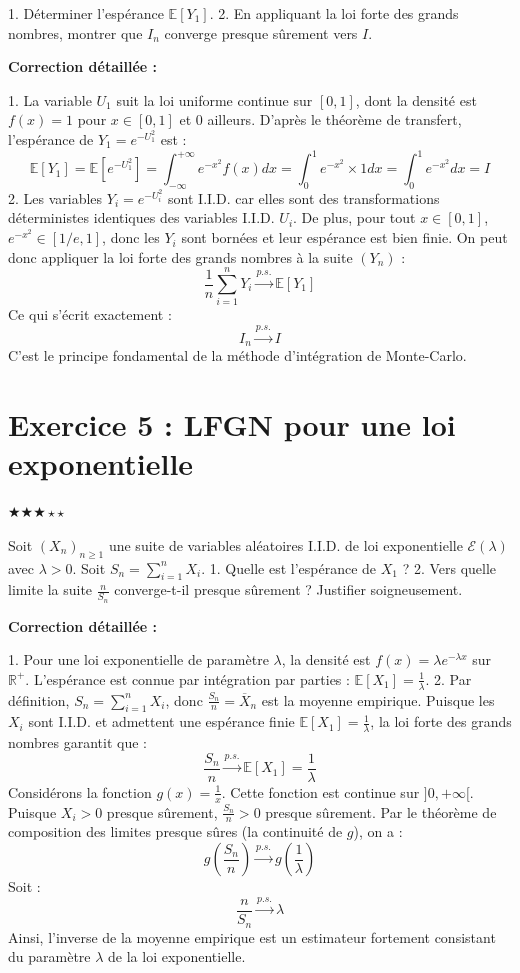 \documentclass[11pt,a4paper]{article}
\begin{document}
1. Déterminer l'espérance $\mathbb{E}[Y_1]$.
2. En appliquant la loi forte des grands nombres, montrer que $I_n$ converge presque sûrement vers $I$.

\textbf{Correction détaillée :}

1. La variable $U_1$ suit la loi uniforme continue sur $[0, 1]$, dont la densité est $f(x) = 1$ pour $x \in [0, 1]$ et $0$ ailleurs.
   D'après le théorème de transfert, l'espérance de $Y_1 = e^{-U_1^2}$ est :
   $$ \mathbb{E}[Y_1] = \mathbb{E}[e^{-U_1^2}] = \int_{-\infty}^{+\infty} e^{-x^2} f(x) dx = \int_0^1 e^{-x^2} \times 1 dx = \int_0^1 e^{-x^2} dx = I $$
2. Les variables $Y_i = e^{-U_i^2}$ sont I.I.D. car elles sont des transformations déterministes identiques des variables I.I.D. $U_i$.
   De plus, pour tout $x \in [0, 1]$, $e^{-x^2} \in [1/e, 1]$, donc les $Y_i$ sont bornées et leur espérance est bien finie.
   On peut donc appliquer la loi forte des grands nombres à la suite $(Y_n)$ :
   $$ \frac{1}{n} \sum_{i=1}^n Y_i \xrightarrow{p.s.} \mathbb{E}[Y_1] $$
   Ce qui s'écrit exactement :
   $$ I_n \xrightarrow{p.s.} I $$
   C'est le principe fondamental de la méthode d'intégration de Monte-Carlo.


\section*{Exercice 5 : LFGN pour une loi exponentielle}

$\bigstar\bigstar\bigstar\star\star$

Soit $(X_n)_{n \geq 1}$ une suite de variables aléatoires I.I.D. de loi exponentielle $\mathcal{E}(\lambda)$ avec $\lambda > 0$.
Soit $S_n = \sum_{i=1}^n X_i$.
1. Quelle est l'espérance de $X_1$ ?
2. Vers quelle limite la suite $\frac{n}{S_n}$ converge-t-il presque sûrement ? Justifier soigneusement.

\textbf{Correction détaillée :}

1. Pour une loi exponentielle de paramètre $\lambda$, la densité est $f(x) = \lambda e^{-\lambda x}$ sur $\mathbb{R}^+$. L'espérance est connue par intégration par parties : $\mathbb{E}[X_1] = \frac{1}{\lambda}$.
2. Par définition, $S_n = \sum_{i=1}^n X_i$, donc $\frac{S_n}{n} = \overline{X}_n$ est la moyenne empirique.
   Puisque les $X_i$ sont I.I.D. et admettent une espérance finie $\mathbb{E}[X_1] = \frac{1}{\lambda}$, la loi forte des grands nombres garantit que :
   $$ \frac{S_n}{n} \xrightarrow{p.s.} \mathbb{E}[X_1] = \frac{1}{\lambda} $$
   Considérons la fonction $g(x) = \frac{1}{x}$. Cette fonction est continue sur $]0, +\infty[$.
   Puisque $X_i > 0$ presque sûrement, $\frac{S_n}{n} > 0$ presque sûrement.
   Par le théorème de composition des limites presque sûres (la continuité de $g$), on a :
   $$ g\left(\frac{S_n}{n}\right) \xrightarrow{p.s.} g\left(\frac{1}{\lambda}\right) $$
   Soit :
   $$ \frac{n}{S_n} \xrightarrow{p.s.} \lambda $$
   Ainsi, l'inverse de la moyenne empirique est un estimateur fortement consistant du paramètre $\lambda$ de la loi exponentielle.
\end{document}
